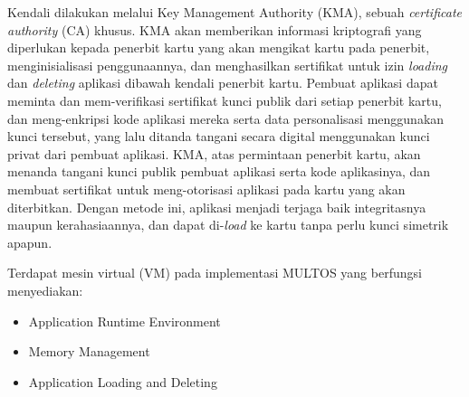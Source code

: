 \documentclass[a4paper, 12pt]{report}
\begin{document}
Kendali dilakukan melalui Key Management Authority (KMA), sebuah \emph{certificate authority} (CA) khusus. KMA akan memberikan informasi kriptografi yang diperlukan kepada penerbit kartu yang akan mengikat kartu pada penerbit, menginisialisasi penggunaannya, dan menghasilkan sertifikat untuk izin \emph{loading} dan \emph{deleting} aplikasi dibawah kendali penerbit kartu. Pembuat aplikasi dapat meminta dan mem-verifikasi sertifikat kunci publik dari setiap penerbit kartu, dan meng-enkripsi kode aplikasi mereka serta data personalisasi menggunakan kunci tersebut, yang lalu ditanda tangani secara digital menggunakan kunci privat dari pembuat aplikasi. KMA, atas permintaan penerbit kartu, akan menanda tangani kunci publik pembuat aplikasi serta kode aplikasinya, dan membuat sertifikat untuk meng-otorisasi aplikasi pada kartu yang akan diterbitkan. Dengan metode ini, aplikasi menjadi terjaga baik integritasnya maupun kerahasiaannya, dan dapat di-\emph{load} ke kartu tanpa perlu kunci simetrik apapun. 

Terdapat mesin virtual (VM) pada implementasi MULTOS yang berfungsi menyediakan:

\begin{itemize}
\item Application Runtime Environment

\item Memory Management
\item Application Loading and Deleting
\end{itemize}
\end{document}
